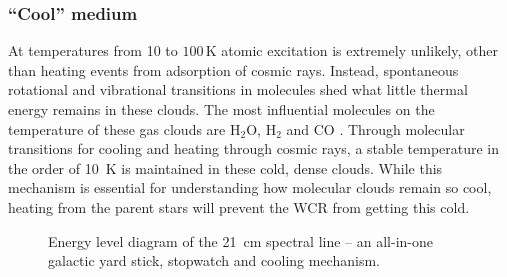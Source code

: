 \subsubsection{``Cool'' medium}

At temperatures from 10 to $100 \, \si{\kelvin}$ atomic excitation is extremely unlikely, other than heating events from adsorption of cosmic rays.
Instead, spontaneous rotational and vibrational transitions in molecules shed what little thermal energy remains in these clouds.
The most influential molecules on the temperature of these gas clouds are $\text{H}_2 \text{O}$, $\text{H}_2$ and $\text{CO}$
\parencite{neufeldRadiativeCoolingWarm1993,neufeldThermalBalanceDense1995}.
Through molecular transitions for cooling and heating through cosmic rays, a stable temperature in the order of \SI{10}{\kelvin} is maintained in these cold, dense clouds.
While this mechanism is essential for understanding how molecular clouds remain so cool, heating from the parent stars will prevent the WCR from getting this cold.


\begin{figure}[H]
  \caption[The \SI{21}{cm} spectral line]{Energy level diagram of the \SI{21}{cm} spectral line -- an all-in-one galactic yard stick, stopwatch and cooling mechanism.}
  \label{fig:quiver-h}
\end{figure}

